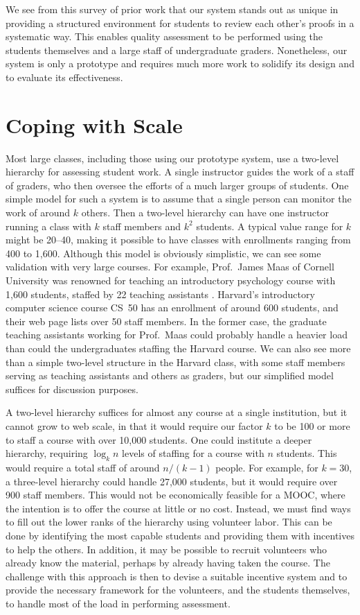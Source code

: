 \documentclass[12pt]{article}
\begin{document}
We see from this survey of prior work that our system stands out as
unique in providing a structured environment for students to review
each other's proofs in a systematic way.  This enables quality
assessment to be performed using the students themselves and a large
staff of undergraduate graders.  Nonetheless, our system is only a
prototype and requires much more work to solidify its design and to
evaluate its effectiveness.

\section{Coping with Scale}

Most large classes, including those using our prototype system, use a
two-level hierarchy for assessing student work.  A single instructor
guides the work of a staff of graders, who then oversee the efforts of
a much larger groups of students.  One simple model for such a system
is to assume that a single person can monitor the work of around $k$
others.  Then a two-level hierarchy can have one instructor running a
class with $k$ staff members and $k^2$ students.  A typical value
range for $k$ might be 20--40, making it possible to have classes with
enrollments ranging from 400 to 1,600.  Although this model is
obviously simplistic, we can see some validation with very large
courses.  For example, Prof.~James Maas of Cornell University was
renowned for teaching an introductory psychology course with 1,600
students, staffed by 22 teaching assistants \citep{arenson-nyt00}.
Harvard's introductory computer science course CS~50 has an enrollment
of around 600 students, and their web page lists over 50 staff
members.  In the former case, the graduate teaching assistants working
for Prof.~Maas could probably handle a heavier load than could the
undergraduates staffing the Harvard course.  We can also see more than
a simple two-level structure in the Harvard class, with some staff members
serving as teaching assistants and others as graders, but our
simplified model suffices for discussion purposes.

A two-level hierarchy suffices for almost any course at a single
institution, but it cannot grow to web scale, in that it would require
our factor $k$ to be 100 or more to staff a course with over 10,000
students.  One could institute a deeper hierarchy,
requiring $\log_k n$ levels of staffing for a course with $n$ students.
This would require a
total staff of around $n/(k-1)$ people.  For example, for $k = 30$, a
three-level hierarchy could handle 27,000 students, but it would
require over 900 staff members.  This would not be economically feasible
for a MOOC, where the intention is to offer the course at little or no
cost.  Instead, we must find ways to fill out the lower ranks of the
hierarchy using volunteer labor.  This can be done by identifying the
most capable students and providing them with incentives to help the
others.  In addition, it may be possible to recruit volunteers who
already know the material, perhaps by already having taken the course.
The challenge with this approach is then to devise a suitable
incentive system and to provide the necessary framework for the
volunteers, and the students themselves, to handle most of the load in
performing assessment.
\end{document}
